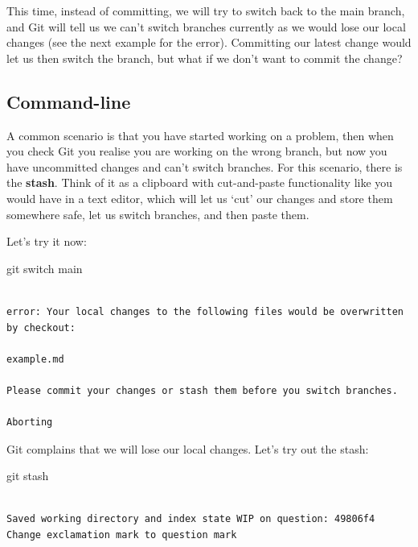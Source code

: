 \documentclass[
  letterpaper,
  DIV=11,
  numbers=noendperiod]{scrartcl}
\newenvironment{Shaded}{\begin{snugshade}}{\end{snugshade}}
\newcommand{\FunctionTok}[1]{\textcolor[rgb]{0.28,0.35,0.67}{#1}}
\newcommand{\NormalTok}[1]{\textcolor[rgb]{0.00,0.23,0.31}{#1}}
\begin{document}
This time, instead of committing, we will try to switch back to the main
branch, and Git will tell us we can't switch branches currently as we
would lose our local changes (see the next example for the error).
Committing our latest change would let us then switch the branch, but
what if we don't want to commit the change?

\subsection{Command-line}

A common scenario is that you have started working on a problem, then
when you check Git you realise you are working on the wrong branch, but
now you have uncommitted changes and can't switch branches. For this
scenario, there is the \textbf{stash}. Think of it as a clipboard with
cut-and-paste functionality like you would have in a text editor, which
will let us `cut' our changes and store them somewhere safe, let us
switch branches, and then paste them.

Let's try it now:

\begin{Shaded}
\begin{Highlighting}[]
\FunctionTok{git}\NormalTok{ switch main}
\end{Highlighting}
\end{Shaded}

\begin{verbatim}

error: Your local changes to the following files would be overwritten by checkout:

example.md

Please commit your changes or stash them before you switch branches.

Aborting
\end{verbatim}

Git complains that we will lose our local changes. Let's try out the
stash:

\begin{Shaded}
\begin{Highlighting}[]
\FunctionTok{git}\NormalTok{ stash}
\end{Highlighting}
\end{Shaded}

\begin{verbatim}

Saved working directory and index state WIP on question: 49806f4 Change exclamation mark to question mark
\end{verbatim}
\end{document}
